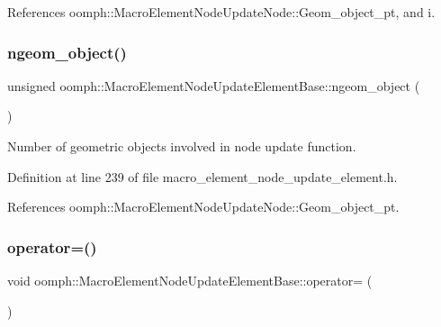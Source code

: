 References oomph\+::\+Macro\+Element\+Node\+Update\+Node\+::\+Geom\+\_\+object\+\_\+pt, and i.

\mbox{\label{classoomph_1_1MacroElementNodeUpdateElementBase_a31a4ae979b76ca288513570e66dcec52}} 
\subsubsection{\texorpdfstring{ngeom\+\_\+object()}{ngeom\_object()}}
{\footnotesize\ttfamily unsigned oomph\+::\+Macro\+Element\+Node\+Update\+Element\+Base\+::ngeom\+\_\+object (\begin{DoxyParamCaption}{ }\end{DoxyParamCaption})\hspace{0.3cm}{\ttfamily [inline]}}



Number of geometric objects involved in node update function. 



Definition at line 239 of file macro\+\_\+element\+\_\+node\+\_\+update\+\_\+element.\+h.



References oomph\+::\+Macro\+Element\+Node\+Update\+Node\+::\+Geom\+\_\+object\+\_\+pt.

\mbox{\label{classoomph_1_1MacroElementNodeUpdateElementBase_a0ed75919d7e8f45f58edead7746dd436}} 
\subsubsection{\texorpdfstring{operator=()}{operator=()}}
{\footnotesize\ttfamily void oomph\+::\+Macro\+Element\+Node\+Update\+Element\+Base\+::operator= (\begin{DoxyParamCaption}\item[{const \hyperlink{classoomph_1_1MacroElementNodeUpdateElementBase}{Macro\+Element\+Node\+Update\+Element\+Base} \&}]{ }\end{DoxyParamCaption})\hspace{0.3cm}{\ttfamily [inline]}}



